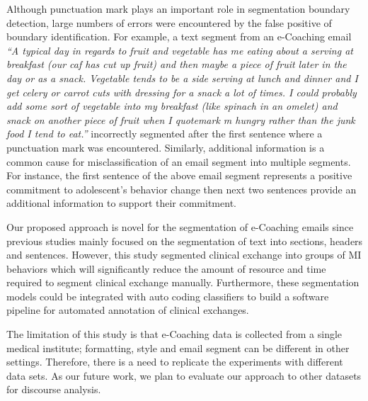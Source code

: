 \documentclass{amia}
\begin{document}
Although punctuation mark plays an important role in segmentation boundary detection, large numbers of errors were encountered by the false positive of boundary identification. For example, a text segment from an e-Coaching email \textit{``A typical day in regards to fruit and vegetable has me eating about a serving at breakfast (our caf has cut up fruit) and then maybe a piece of fruit later in the day or as a snack. Vegetable tends to be a side serving at lunch and dinner and I get celery or carrot cuts with dressing for a snack a lot of times. I could probably add some sort of vegetable into my breakfast (like spinach in an omelet) and snack on another piece of fruit when I quotemark m hungry rather than the junk food I tend to eat.''} incorrectly segmented after the first sentence where a punctuation mark was encountered. Similarly, additional information is a common cause for misclassification of an email segment into multiple segments. For instance, the first sentence of the above email segment represents a positive commitment to adolescent's behavior change then next two sentences provide an additional information to support their commitment. 

Our proposed approach is novel for the segmentation of e-Coaching emails since previous studies mainly focused on the segmentation of text into sections, headers and sentences. However, this study segmented clinical exchange into groups of MI behaviors which will significantly reduce the amount of resource and time required to segment clinical exchange manually. Furthermore, these segmentation models could be integrated with auto coding classifiers to build a software pipeline for automated annotation of clinical exchanges.

The limitation of this study is that e-Coaching data is collected from a single medical institute; formatting, style and email segment can be different in other settings. Therefore, there is a need to replicate the experiments with different data sets. As our future work, we plan to evaluate our approach to other datasets for discourse analysis. 
 
\end{document}
